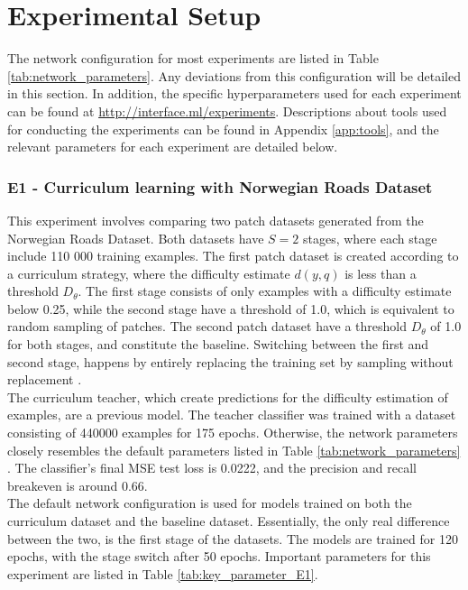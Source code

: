 \section{Experimental Setup}
\label{sec:experimentalSetup}
The network configuration for most experiments are listed in Table \ref{tab:network_parameters}. Any deviations from this configuration will be detailed in this section. In addition, the specific hyperparameters used for each experiment can be found at \url{http://interface.ml/experiments}. Descriptions about tools used for conducting the experiments can be found in Appendix \ref{app:tools}, and the relevant parameters for each experiment are detailed below.\\ 

\subsubsection{E1 - Curriculum learning with Norwegian Roads Dataset}
This experiment involves comparing two patch datasets generated from the Norwegian Roads Dataset. Both datasets have $S=2$ stages, where each stage include 110 000 training examples. The first patch dataset is created according to a curriculum strategy, where the difficulty estimate $d(y, q)$ is less than a threshold $D_\theta$. The first stage consists of only examples with a difficulty estimate below 0.25,  while the second stage have a threshold of 1.0, which is equivalent to random sampling of patches. The second patch dataset have a threshold $D_\theta$ of 1.0 for both stages, and constitute the baseline. Switching between the first and second stage, happens by entirely replacing the training set by sampling without replacement .\\

The curriculum teacher, which create predictions for the difficulty estimation of examples, are a previous model. The teacher classifier was trained with a dataset consisting of 440000 examples for 175 epochs. Otherwise, the network parameters closely resembles the default parameters listed in Table \ref{tab:network_parameters} . The classifier's final \ac{MSE} test loss is 0.0222, and the precision and recall breakeven is around 0.66. \\

The default network configuration is used for models trained on both the curriculum dataset and the baseline dataset. Essentially, the only real difference between the two, is the first stage of the datasets. The models are trained for 120 epochs, with the stage switch after 50 epochs. Important parameters for this experiment are listed in Table \ref{tab:key_parameter_E1}.\\


